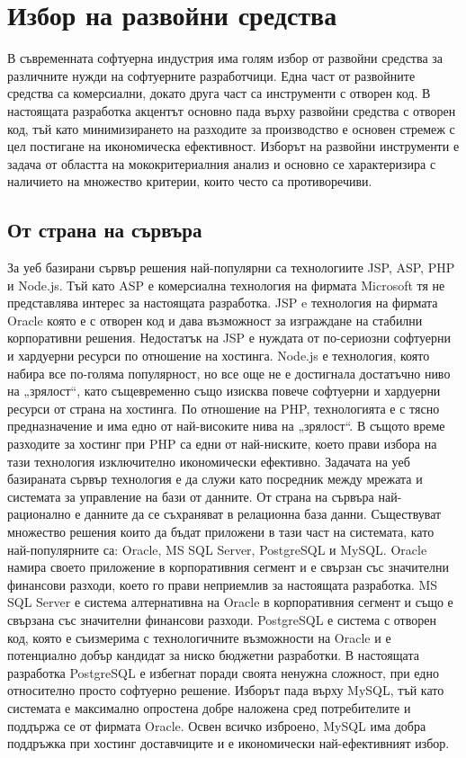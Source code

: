 \documentclass[book,14pt,oneside,openany]{memoir}
\begin{document}
\section{Избор на развойни средства}

В съвременната софтуерна индустрия има голям избор от развойни средства за различните нужди на софтуерните разработчици. Една част от развойните средства са комерсиални, докато друга част са инструменти с отворен код. В настоящата разработка акцентът основно пада върху развойни средства с отворен код, тъй като минимизирането на разходите за производство е основен стремеж с цел постигане на икономическа ефективност. Изборът на развойни инструменти е задача от областта на мококритериалния анализ и основно се характеризира с наличието на множество критерии, които често са противоречиви. 

\subsection{От страна на сървъра}

За уеб базирани сървър решения най-популярни са технологиите JSP, ASP, PHP и Node.js. Тъй като ASP е комерсиална технология на фирмата Microsoft тя не представлява интерес за настоящата разработка. JSP e технология на фирмата Oracle която е с отворен код и дава възможност за изграждане на стабилни корпоративни решения. Недостатък на JSP е нуждата от по-сериозни софтуерни и хардуерни ресурси по отношение на хостинга. Node.js е технология, която набира все по-голяма популярност, но все още не е достигнала достатъчно ниво на „зрялост“, като същевременно също изисква повече софтуерни и хардуерни ресурси от страна на хостинга. По отношение на PHP, технологията е с тясно предназначение и има едно от най-високите нива на „зрялост“. В същото време разходите за хостинг при PHP са едни от най-ниските, което прави избора на тази технология изключително икономически ефективно. Задачата на уеб базираната сървър технология е да служи като посредник между мрежата и системата за управление на бази от данните. От страна на сървъра най-рационално е данните да се съхраняват в релационна база данни. Съществуват множество решения които да бъдат приложени в тази част на системата, като най-популярните са: Oracle, MS SQL Server, PostgreSQL и MySQL. Oracle намира своето приложение в корпоративния сегмент и е свързан със значителни финансови разходи, което го прави неприемлив за настоящата разработка. MS SQL Server е система алтернативна на Oracle в корпоративния сегмент и също е свързана със значителни финансови разходи. PostgreSQL е система с отворен код, която е съизмерима с технологичните възможности на Oracle и е потенциално добър кандидат за ниско бюджетни разработки. В настоящата разработка PostgreSQL е избегнат поради своята ненужна сложност, при едно относително просто софтуерно решение. Изборът пада върху MySQL, тъй като системата е максимално опростена добре наложена сред потребителите и поддържа се от фирмата Oracle. Освен всичко изброено, MySQL има добра поддръжка при хостинг доставчиците и е икономически най-ефективният избор. 
\end{document}
